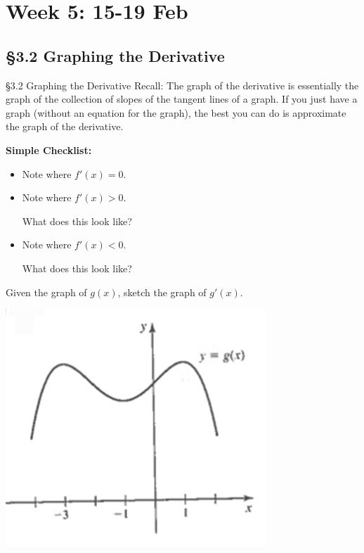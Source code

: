\documentclass[cal1spr16Lectures.tex]{subfiles}
\begin{document}
\section[Week 5]{Week 5: 15-19 Feb}

\subsection[3.2 Graphing the Derivative]{\S 3.2 Graphing the Derivative}

\begin{frame}{\S 3.2 Graphing the Derivative}
Recall: The graph of the derivative is essentially the graph of the collection of slopes of the tangent lines of a graph.  If you just have a graph (without an equation for the graph), the best you can do is approximate the graph of the derivative.
\end{frame}

\begin{frame}{}{}
{\bf Simple Checklist:} 
\begin{itemize}
\item[1. ] Note where $f'(x)=0$.
\item[2. ] Note where $f'(x)>0$. 
\begin{que} What does this look like? \end{que}
\item[3. ] Note where $f'(x)<0$.
\begin{que} What does this look like? \end{que}
\end{itemize}
\end{frame}

\begin{frame}{}
\begin{ex}
Given the graph of $g(x)$, sketch the graph of $g'(x)$.

\begin{center}
\includegraphics[scale=0.9]{pictures/Ch3Sect2new1}
\end{center}
\end{ex}
\end{frame}
\end{document}
